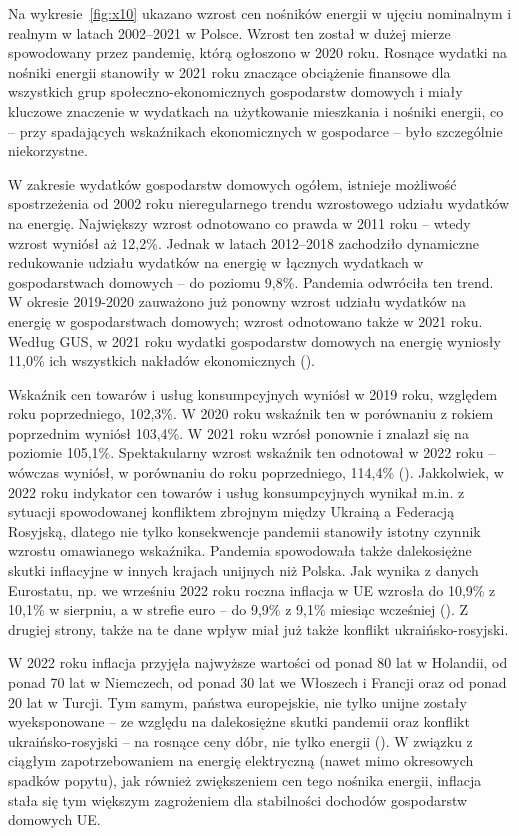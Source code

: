 \documentclass[polish, twoside, 12pt, a4paper]{article}
\theoremstyle{definition}
\theoremstyle{plain}
\theoremstyle{remark}
\begin{document}
Na wykresie~\ref{fig:x10} ukazano wzrost cen nośników energii w ujęciu nominalnym i realnym w latach 2002–2021 w Polsce. Wzrost ten został w dużej mierze spowodowany przez pandemię, którą ogłoszono w 2020 roku. Rosnące wydatki na nośniki energii stanowiły w 2021 roku znaczące obciążenie finansowe dla wszystkich grup społeczno-ekonomicznych gospodarstw domowych i miały kluczowe znaczenie w wydatkach na użytkowanie mieszkania i nośniki energii, co – przy spadających wskaźnikach ekonomicznych w gospodarce – było szczególnie niekorzystne. 

W zakresie wydatków gospodarstw domowych ogółem, istnieje możliwość spostrzeżenia od 2002 roku nieregularnego trendu wzrostowego udziału wydatków na energię. Największy wzrost odnotowano co prawda w 2011 roku – wtedy wzrost wyniósł aż 12,2\%. Jednak w latach 2012–2018 zachodziło dynamiczne redukowanie udziału wydatków na energię w łącznych wydatkach w gospodarstwach domowych – do poziomu 9,8\%. Pandemia odwróciła ten trend. W okresie 2019-2020 zauważono już ponowny wzrost udziału wydatków na energię w gospodarstwach domowych; wzrost odnotowano także w 2021 roku. Według GUS, w 2021 roku wydatki gospodarstw domowych na energię wyniosły 11,0\% ich wszystkich nakładów ekonomicznych (\cite{gus2023}). 

Wskaźnik cen towarów i usług konsumpcyjnych wyniósł w 2019 roku, względem roku poprzedniego, 102,3\%. W 2020 roku wskaźnik ten w porównaniu z rokiem poprzednim wyniósł 103,4\%. W 2021 roku wzrósł ponownie i znalazł się na poziomie 105,1\%. Spektakularny wzrost wskaźnik ten odnotował w 2022 roku – wówczas wyniósł, w porównaniu do roku poprzedniego, 114,4\% (\cite{gus2023}). Jakkolwiek, w 2022 roku indykator cen towarów i usług konsumpcyjnych wynikał m.in. z sytuacji spowodowanej konfliktem zbrojnym między Ukrainą a Federacją Rosyjską, dlatego nie tylko konsekwencje pandemii stanowiły istotny czynnik wzrostu omawianego wskaźnika. Pandemia spowodowała także dalekosiężne skutki inflacyjne w innych krajach unijnych niż Polska. Jak wynika z danych Eurostatu, np. we wrześniu 2022 roku roczna inflacja w UE wzrosła do 10,9\% z 10,1\% w sierpniu, a w strefie euro – do 9,9\% z 9,1\% miesiąc wcześniej (\cite{rp2022}). Z drugiej strony, także na te dane wpływ miał już także konflikt ukraińsko-rosyjski. 

W 2022 roku inflacja przyjęła najwyższe wartości od ponad 80 lat w Holandii, od ponad 70 lat w Niemczech, od ponad 30 lat we Włoszech i Francji oraz od ponad 20 lat w Turcji. Tym samym, państwa europejskie, nie tylko unijne zostały wyeksponowane – ze względu na dalekosiężne skutki pandemii oraz konflikt ukraińsko-rosyjski – na rosnące ceny dóbr, nie tylko energii (\cite{infor2022}). W związku z ciągłym zapotrzebowaniem na energię elektryczną (nawet mimo okresowych spadków popytu), jak również zwiększeniem cen tego nośnika energii, inflacja stała się tym większym zagrożeniem dla stabilności dochodów gospodarstw domowych UE. 
\end{document}
